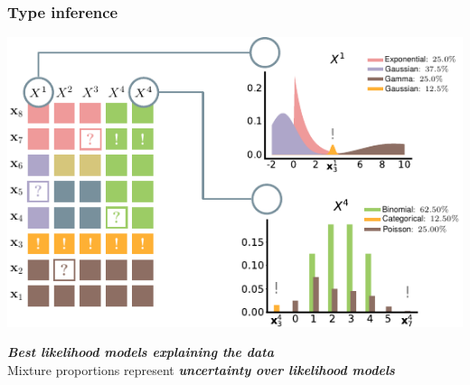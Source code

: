\documentclass[xcolor={usenames,dvipsnames,svgnames}, compress, aspectratio=169, 11pt]{beamer}
\begin{document}
    

\begin{frame}[t, htt=bgrey2]
  \frametitle{Type inference}

  \large
  \begin{minipage}[t]{0.5\linewidth}
    \includegraphics[width=1.25\linewidth]{figures/abda-type-inf}
  \end{minipage}\hfill\begin{minipage}[t]{0.3\linewidth}
    \raggedright
    \vspace{-120pt}
    \emph{\textbf{Best likelihood models explaining the data}}\\[25pt]

    Mixture proportions represent \emph{\textbf{uncertainty over likelihood models}}\\[10pt]

    
  \end{minipage}  
\end{frame}
\end{document}
